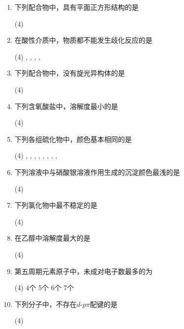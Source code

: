 \begin{enumerate}[label=\arabic*., itemsep=1.5ex]
    \item 下列配合物中，具有平面正方形结构的是
    \begin{tasks}(4)
        \task {}
        \task {}
        \task {}
        \task {}
    \end{tasks}
    \item 在酸性介质中，物质都不能发生歧化反应的是
    \begin{tasks}(4)
        \task {}, 
        \task {}, 
        \task {}, 
        \task {}, 
    \end{tasks}
    \item 下列配合物中，没有旋光异构体的是
    \begin{tasks}(4)
        \task {}
        \task {}
        \task {}
        \task \ce{[PtCl3(NH3)(OH)]}
    \end{tasks}
    \item 下列含氧酸盐中，溶解度最小的是
    \begin{tasks}(4)
        \task {}
        \task {}
        \task {}
        \task {}
    \end{tasks}
    \item 下列各组硫化物中，颜色基本相同的是
    \begin{tasks}(4)
        \task {}, , 
        \task {}, , 
        \task {}, , 
        \task {}, , 
    \end{tasks}
    \item 下列溶液中与硝酸银溶液作用生成的沉淀颜色最浅的是
    \begin{tasks}(4)
        \task {}
        \task {}
        \task {}
        \task {}
    \end{tasks}
    \item 下列氯化物中最不稳定的是
    \begin{tasks}(4)
        \task {}
        \task {}
        \task {}
        \task {}
    \end{tasks}
    \item 在乙醇中溶解度最大的是
    \begin{tasks}(4)
        \task {}
        \task {}
        \task {}
        \task {}
    \end{tasks}
    \item 第五周期元素原子中，未成对电子数最多的为
    \begin{tasks}(4)
        \task 4个
        \task 5个
        \task 6个
        \task 7个
    \end{tasks}
    \item 下列分子中，不存在$d$-$p\pi$配键的是
    \begin{tasks}(4)
        \task {}
        \task {}
        \task {}
        \task {}
    \end{tasks}
\end{enumerate}

